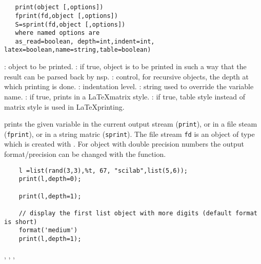 

\begin{mandesc}
  \\
  \\
\end{mandesc}
\label{print}
\begin{calling_sequence}
\begin{verbatim}
   print(object [,options])
   fprint(fd,object [,options]) 
   S=sprint(fd,object [,options]) 
   where named options are 
   as_read=boolean, depth=int,indent=int, latex=boolean,name=string,table=boolean) 
\end{verbatim}
\end{calling_sequence}

\begin{parameters}
  \begin{varlist}
    : object to be printed.
    : if true, object is to be printed in such a way that the result can be 
    parsed back by nsp.
    : control, for recursive objects, the depth at which printing
    is done.
    : indentation level.
    : string used to override the variable name.
    : if true, prints in a \LaTeX matrix style.
    : if true, table style instead of matrix style is used in \LaTeX printing.
  \end{varlist}
\end{parameters}

\begin{mandescription}
  prints the given variable in the current output stream (\verb+print+), 
  or in a file steam (\verb+fprint+), or in a string matric (\verb+sprint+).
  The file stream \verb+fd+ is an object of type  which 
  is created with . For object with double precision numbers
  the output format/precision can be changed with the  function. 
\end{mandescription}
\begin{examples}
  \begin{Verbatim}
    l =list(rand(3,3),%t, 67, "scilab",list(5,6));
    print(l,depth=0);

    print(l,depth=1);

    // display the first list object with more digits (default format is short)
    format('medium')
    print(l,depth=1);
  \end{Verbatim}
\end{examples}
\begin{manseealso}
  , , , 
\end{manseealso}

